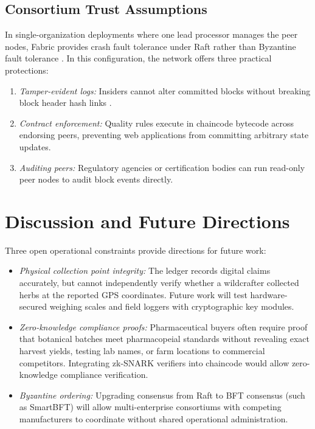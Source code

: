 \documentclass[conference]{IEEEtran}
\begin{document}
\subsection{Consortium Trust Assumptions}
In single-organization deployments where one lead processor manages the peer nodes, Fabric provides crash fault tolerance under Raft rather than Byzantine fault tolerance \cite{castro2002practical}. In this configuration, the network offers three practical protections:
\begin{enumerate}
    \item \emph{Tamper-evident logs:} Insiders cannot alter committed blocks without breaking block header hash links \cite{merkle1987digital}.
    \item \emph{Contract enforcement:} Quality rules execute in chaincode bytecode across endorsing peers, preventing web applications from committing arbitrary state updates.
    \item \emph{Auditing peers:} Regulatory agencies or certification bodies can run read-only peer nodes to audit block events directly.
\end{enumerate}

\section{Discussion and Future Directions}
Three open operational constraints provide directions for future work:
\begin{itemize}
    \item \emph{Physical collection point integrity:} The ledger records digital claims accurately, but cannot independently verify whether a wildcrafter collected herbs at the reported GPS coordinates. Future work will test hardware-secured weighing scales and field loggers with cryptographic key modules.
    \item \emph{Zero-knowledge compliance proofs:} Pharmaceutical buyers often require proof that botanical batches meet pharmacopeial standards without revealing exact harvest yields, testing lab names, or farm locations to commercial competitors. Integrating zk-SNARK verifiers into chaincode would allow zero-knowledge compliance verification.
    \item \emph{Byzantine ordering:} Upgrading consensus from Raft to BFT consensus (such as SmartBFT) will allow multi-enterprise consortiums with competing manufacturers to coordinate without shared operational administration.
\end{itemize}
\end{document}
